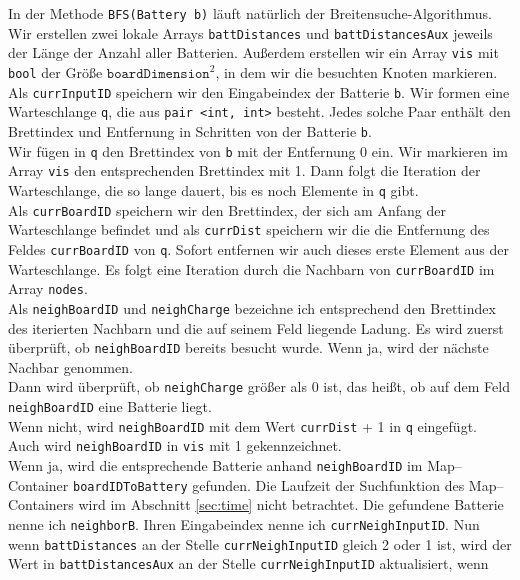 \documentclass[a4paper,10pt,ngerman]{scrartcl}
\begin{document}
In der Methode \texttt{BFS(Battery b)} läuft natürlich der Breitensuche-Algorithmus.
Wir erstellen zwei lokale Arrays \texttt{battDistances} und \texttt{battDistancesAux} jeweils der Länge
der Anzahl aller Batterien. Außerdem erstellen wir ein Array \texttt{vis} mit \texttt{bool} der Größe
$\texttt{boardDimension}^2$, in dem wir die besuchten Knoten markieren.\\
Als \texttt{currInputID} speichern wir den Eingabeindex der Batterie \texttt{b}.
Wir formen eine Warteschlange \texttt{q}, die aus \texttt{pair <int, int>} besteht. Jedes solche Paar enthält
den Brettindex und Entfernung in Schritten von der Batterie \texttt{b}.\\
Wir fügen in \texttt{q} den Brettindex von \texttt{b} mit der Entfernung 0 ein. Wir markieren im Array \texttt{vis}
den entsprechenden Brettindex mit 1. Dann folgt die Iteration der Warteschlange, die so lange dauert, bis es
noch Elemente in \texttt{q} gibt.\\
Als \texttt{currBoardID} speichern wir den Brettindex, der sich am Anfang der Warteschlange befindet
und als \texttt{currDist} speichern wir die die Entfernung des Feldes \texttt{currBoardID} von \texttt{q}.
Sofort entfernen wir auch dieses erste Element aus der Warteschlange. Es folgt eine Iteration durch die Nachbarn
von \texttt{currBoardID} im Array \texttt{nodes}.\\
Als \texttt{neighBoardID} und \texttt{neighCharge} bezeichne ich entsprechend den Brettindex des iterierten
Nachbarn und die auf seinem Feld liegende Ladung. Es wird zuerst überprüft, ob \texttt{neighBoardID}
bereits besucht wurde. Wenn ja, wird der nächste Nachbar genommen.\\
Dann wird überprüft, ob \texttt{neighCharge} größer als 0 ist, das heißt, ob auf dem Feld \texttt{neighBoardID} eine 
Batterie liegt.\\
Wenn nicht, wird \texttt{neighBoardID} mit dem Wert \texttt{currDist} + 1 in \texttt{q} eingefügt.
Auch wird \texttt{neighBoardID} in \texttt{vis} mit 1 gekennzeichnet.\\
Wenn ja, wird die entsprechende Batterie anhand \texttt{neighBoardID} im Map--Container
\texttt{boardIDToBattery} gefunden. Die Laufzeit der Suchfunktion des Map--Containers wird im Abschnitt
\ref{sec:time} nicht betrachtet. Die gefundene Batterie nenne ich \texttt{neighborB}. 
Ihren Eingabeindex nenne ich \texttt{currNeighInputID}.
Nun wenn \texttt{battDistances} an der Stelle \texttt{currNeighInputID} gleich 2 oder 1 ist,
wird der Wert in \texttt{battDistancesAux} an der Stelle \texttt{currNeighInputID} aktualisiert, wenn
\end{document}
